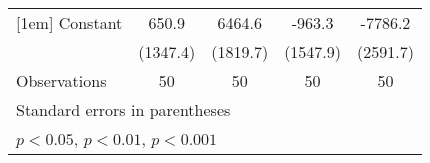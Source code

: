 {\begin{tabular}{l*{4}{c}}
[1em]
Constant            &       650.9         &      6464.6\sym{***}&      -963.3         &     -7786.2\sym{**} \\
                    &    (1347.4)         &    (1819.7)         &    (1547.9)         &    (2591.7)         \\
\hline
Observations        &          50         &          50         &          50         &          50         \\
\hline\hline
\multicolumn{5}{l}{\footnotesize Standard errors in parentheses}\\
\multicolumn{5}{l}{\footnotesize \sym{*} \(p<0.05\), \sym{**} \(p<0.01\), \sym{***} \(p<0.001\)}\\
\end{tabular}
}

